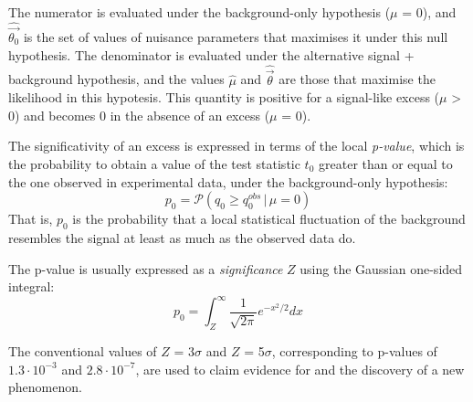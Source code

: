 The numerator is evaluated under the background-only hypothesis ($\mu$ = 0), and $\widehat{\vec{\theta_0}}$ is the set of values of nuisance parameters that maximises it under this null hypothesis.
The denominator is evaluated under the alternative signal + background hypothesis, and the values $\hat{\mu}$ and $\hat{\vec{\theta}}$ are those that maximise the likelihood in this hypotesis.
This quantity is positive for a signal-like excess ($\mu$ > 0) and becomes 0 in the absence of an excess ($\mu$ = 0).

The significativity of an excess is expressed in terms of the local \textit{p-value}, which is the probability to obtain a value of the test statistic $t_0$ greater than or equal to the one observed in experimental data, under the background-only hypothesis:
\begin{equation}
  \label{eq:pvalue}
  p_0 = \mathcal{P}(q_0 \ge q_0^{obs}\, |\, \mu = 0)
\end{equation}
That is, $p_0$ is the probability that a local statistical fluctuation of the background resembles the signal at least as much as the observed data do.

The p-value is usually expressed as a \textit{significance} $Z$ using the Gaussian one-sided integral:
\begin{equation}
  \label{eq:significance}
  p_0 = \int_Z^\infty \frac{1}{\sqrt{2\pi}}e^{-x^2/2}dx
\end{equation}

The conventional values of $Z$ = 3$\sigma$ and $Z$ = 5$\sigma$, corresponding to p-values of $1.3 \cdot 10^{-3}$ and $2.8 \cdot 10^{-7}$, are used to claim evidence for and the discovery of a new phenomenon.

